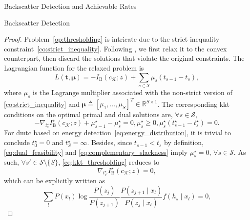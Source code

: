 \documentclass[journal]{IEEEtran}
\begin{document}
\begin{section}{Backscatter Detection and Achievable Rates}
\begin{subsection}{Backscatter Detection}
\begin{proof}
				Problem~\eqref{op:thresholding} is intricate due to the strict inequality constraint~\eqref{co:strict_inequality}. Following \cite{Nguyen2020}, we first relax it to the convex counterpart, then discard the solutions that violate the original constraints. The Lagrangian function for the relaxed problem is
				\begin{equation}
					L(\boldsymbol{t},\boldsymbol{\mu}) = - I_{\mathrm{B}}(c_{\mathcal{K}};z) + \sum_{s \in \mathcal{S}} \mu_s (t_{s-1} - t_s),
				\end{equation}
				where $\mu_s$ is the Lagrange multiplier associated with the non-strict version of \eqref{co:strict_inequality} and $\boldsymbol{\mu} \triangleq [\mu_1,\ldots,\mu_S]^T \in \mathbb{R}^{S \times 1}$. The corresponding \gls{kkt} conditions on the optimal primal and dual solutions are, $\forall s \in \mathcal{S}$,
				\begin{subequations}
					\begin{equation}
						- \nabla_{t_s^{\star}} I^{\star}_{\mathrm{B}}(c_{\mathcal{K}};z) + \mu_{s-1}^{\star} - \mu_s^{\star} = 0,
						\label{eq:stationarity}
					\end{equation}
					\begin{equation}
						\mu_s^{\star} \ge 0,
						\label{eq:dual_feasibility}
					\end{equation}
					\begin{equation}
						\mu_s^{\star} (t_{s-1}^{\star} - t_s^{\star}) = 0.
						\label{eq:complementary_slackness}
					\end{equation}
					\label{eq:kkt_thresholding}
				\end{subequations}
				For \gls{dmtc} based on energy detection~\eqref{eq:energy_distribution}, it is trivial to conclude $t_0^{\star} = 0$ and $t_S^{\star} = \infty$. Besides, since $t_{s-1} < t_s$ by definition, \eqref{eq:dual_feasibility} and \eqref{eq:complementary_slackness} imply $\mu_s^{\star} = 0$, $\forall s \in \mathcal{S}$. As such, $\forall s' \in \mathcal{S} \setminus \{S\}$, \eqref{eq:kkt_thresholding} reduces to
				\begin{equation}
					\nabla_{t_{s'}^{\star}} I^{\star}_{\mathrm{B}}(c_{\mathcal{K}};z) = 0,
				\end{equation}
				which can be explicitly written as
				\begin{equation}
					\sum_l P(x_l) \log \frac{P(z_j)}{P(z_{j+1})} \frac{P(z_{j+1} \mid x_l)}{P(z_j \mid x_l)} f(h_s \mid x_l) = 0,

\end{equation}
\end{proof}
\end{subsection}
\end{section}
\end{document}

